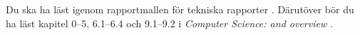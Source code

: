 Du ska ha läst igenom rapportmallen för tekniska rapporter 
\citep{Bosk2012etr,MiUn2012rft}.
Därutöver bör du ha läst kapitel 0--5, 6.1--6.4 och 9.1--9.2 i \emph{Computer 
Science: and overview} \citep{Brookshear2012csa}.
